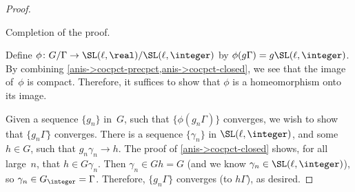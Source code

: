 \begin{proof}
\begin{step}
 Completion of the proof.
 \end{step}
 Define $\phi \colon G/\Gamma \to \SL(\ell,\real) /
\SL(\ell,\integer)$ by $\phi(g\Gamma) = g
\SL(\ell,\integer)$. By combining
\cref{anis->cocpct-precpct,anis->cocpct-closed}, we see that the image
of~$\phi$ is compact.  Therefore, it suffices to show that $\phi$
is a homeomorphism onto its image.

Given a sequence $\{g_n\}$ in~$G$, such that $\{\phi(g_n
\Gamma)\}$ converges, we wish to show that $\{g_n \Gamma\}$
converges. There is a sequence $\{\gamma_n\}$ in
$\SL(\ell,\integer)$, and some $h \in G$, such that $g_n
\gamma_n \to h$. The proof of \cref{anis->cocpct-closed}
shows, for all large~$n$, that $h \in G \gamma_n$. Then
$\gamma_n \in Gh = G$ (and we know $\gamma_n \in \SL(\ell,\integer)$), so $\gamma_n \in G_{\integer} =
\Gamma$. Therefore, $\{g_n \Gamma\}$ converges (to
$h\Gamma$), as desired.
 \end{proof}


